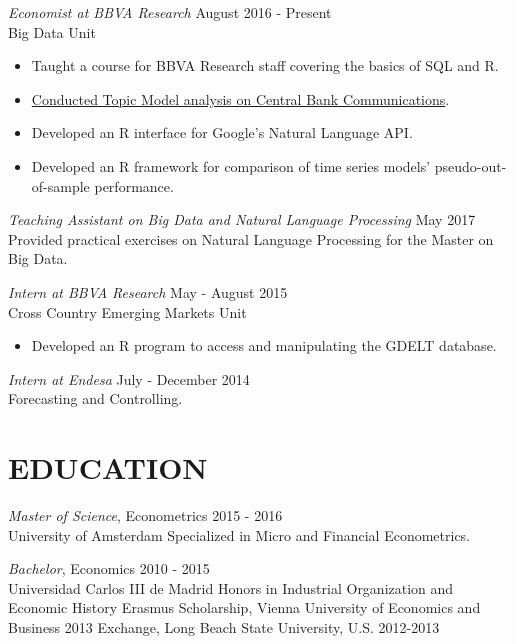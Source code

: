 \documentclass[margin, 10pt]{resume} %
\begin{document}
\begin{resume}
{\sl Economist at BBVA Research} \hfill August 2016 - Present \\
Big Data Unit
\begin{itemize}
\item Taught a course for BBVA Research staff covering the basics of SQL and R.
\item \href{
https://www.bbvaresearch.com/en/publicaciones/how-do-the-emerging-markets-central-bank-talk-a-big-data-approach-to-the-cb-of-turkey/
}
  {Conducted Topic Model analysis on Central Bank Communications}. 
\item Developed an R interface for Google's Natural Language API.
\item Developed an R framework for comparison of time series models' 
  pseudo-out-of-sample performance.
\end{itemize} 

{\sl Teaching Assistant on Big Data and Natural Language Processing} 
\hfill May 2017 \\
Provided practical exercises on Natural Language Processing for 
the Master on Big Data.

{\sl Intern at BBVA Research} \hfill May - August 2015 \\
Cross Country Emerging Markets Unit
\begin{itemize}
\item Developed an R program to access and manipulating the GDELT database.
\end{itemize} 

{\sl Intern at Endesa} \hfill July - December 2014 \\
Forecasting and Controlling.


\section{EDUCATION}

{\sl Master of Science}, Econometrics \hfill 2015 - 2016 \\
University of Amsterdam
Specialized in Micro and Financial Econometrics.

{\sl Bachelor}, Economics \hfill 2010 - 2015 \\
Universidad Carlos III de Madrid
Honors in Industrial Organization and Economic History
Erasmus Scholarship, Vienna University of Economics and Business 
\hfill 2013
Exchange, Long Beach State University, U.S. \hfill 2012-2013


\end{resume}
\end{document}
